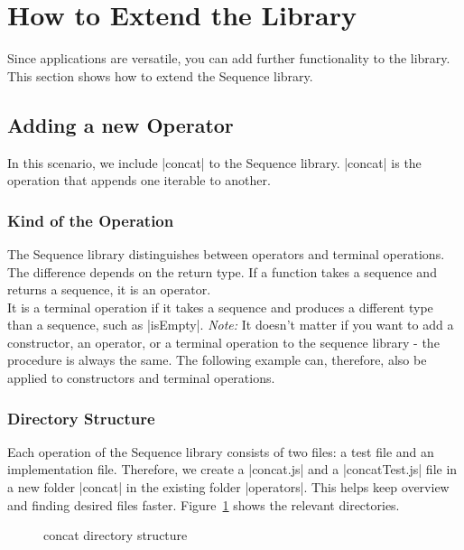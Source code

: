 \section{How to Extend the Library}
\label{sec:How to Extend the Library}
Since applications are versatile, you can add further functionality
to the library. This section shows how to extend the Sequence library.
\subsection{Adding a new Operator}
\label{sub:Adding a new Operator}
In this scenario, we include |concat| to the Sequence library. |concat| is the
operation that appends one iterable to another.

\subsubsection{Kind of the Operation}
\label{subsub:Kind of the Operation}
The Sequence library distinguishes between operators and terminal operations. The
difference depends on the return type. If a function takes a sequence and
returns a sequence, it is an operator. \\ 
It is a terminal operation if it takes a sequence and produces a different type
than a sequence, such as |isEmpty|.
\newline
\textit{Note:} It doesn't matter if you want to add a constructor, an operator, or a terminal
operation to the sequence library - the procedure is always the same. The
following example can, therefore, also be applied to constructors and terminal
operations.

\subsubsection{Directory Structure}
\label{subsub:Directory Structure}
Each operation of the Sequence library consists of two files: a test file and
an implementation file. Therefore, we create a |concat.js| and a
|concatTest.js| file in a new folder |concat| in the existing folder
|operators|. This helps keep overview and finding desired files faster.
Figure~\ref{fig:concat_dir} shows the relevant directories.

\begin{figure}[H]
  \caption{concat directory structure}
  \label{fig:concat_dir}
\end{figure}

